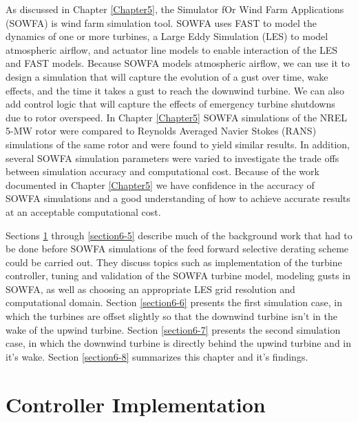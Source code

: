As discussed in Chapter \ref{Chapter5}, the Simulator fOr Wind Farm Applications (SOWFA) is  wind farm simulation tool. SOWFA uses FAST to model the dynamics of one or more turbines, a Large Eddy Simulation (LES) to model atmospheric airflow, and actuator line models to enable interaction of the LES and FAST models. Because SOWFA models atmospheric airflow, we can use it to design a simulation that will capture the evolution of a gust over time, wake effects, and the time it takes a gust to reach the downwind turbine. We can also add control logic that will capture the effects of emergency turbine shutdowns due to rotor overspeed. In Chapter \ref{Chapter5} SOWFA simulations of the NREL 5-MW rotor were compared to Reynolds Averaged Navier Stokes (RANS) simulations of the same rotor and were found to yield similar results. In addition, several SOWFA simulation parameters were varied to investigate the trade offs between simulation accuracy and computational cost. Because of the work documented in Chapter \ref{Chapter5} we have confidence in the accuracy of SOWFA simulations and a good understanding of how to achieve accurate results at an acceptable computational cost.

Sections \ref{section6-2} through \ref{section6-5} describe much of the background work that had to be done before SOWFA simulations of the feed forward selective derating scheme could be carried out. They discuss topics such as implementation of the turbine controller, tuning and validation of the SOWFA turbine model, modeling gusts in SOWFA, as well as choosing an appropriate LES grid resolution and computational domain. Section \ref{section6-6} presents the first simulation case, in which the turbines are offset slightly so that the downwind turbine isn't in the wake of the upwind turbine. Section \ref{section6-7} presents the second simulation case, in which the downwind turbine is directly behind the upwind turbine and in it's wake. Section \ref{section6-8} summarizes this chapter and it's findings.




\section{Controller Implementation} \label{section6-2}

